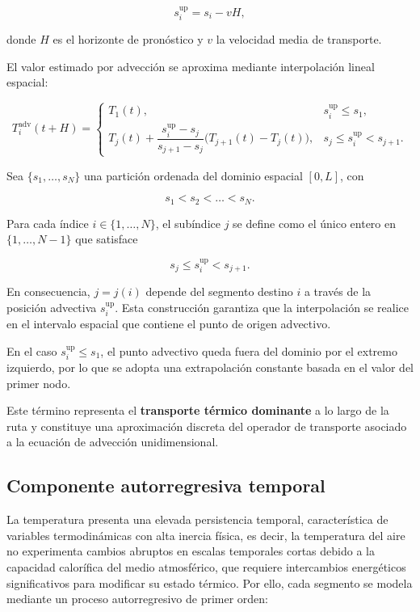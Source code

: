 \documentclass[
  spanish,
  us-letterpaper,
]{scrreprt}
\numberwithin{equation}{section}
\begin{document}
\[
s_i^{\text{up}} = s_i - vH,
\]

donde \(H\) es el horizonte de pronóstico y \(v\) la velocidad media de
transporte.

El valor estimado por advección se aproxima mediante interpolación
lineal espacial:

\[
T_i^{\text{adv}}(t+H) =
\begin{cases}
T_1(t), & s_i^{\text{up}} \le s_1, \\[6pt]
T_j(t) + \dfrac{s_i^{\text{up}} - s_j}{s_{j+1}-s_j}\bigl(T_{j+1}(t)-T_j(t)\bigr), & s_j \le s_i^{\text{up}} < s_{j+1}.
\end{cases}
\]

Sea \(\{s_1,\dots,s_N\}\) una partición ordenada del dominio espacial
\([0,L]\), con

\[
s_1 < s_2 < \dots < s_N.
\]

Para cada índice \(i \in \{1,\dots,N\}\), el subíndice \(j\) se define
como el único entero en \(\{1,\dots,N-1\}\) que satisface

\[
s_j \le s_i^{\text{up}} < s_{j+1}.
\]

En consecuencia, \(j = j(i)\) depende del segmento destino \(i\) a
través de la posición advectiva \(s_i^{\text{up}}\). Esta construcción
garantiza que la interpolación se realice en el intervalo espacial que
contiene el punto de origen advectivo.

En el caso \(s_i^{\text{up}} \le s_1\), el punto advectivo queda fuera
del dominio por el extremo izquierdo, por lo que se adopta una
extrapolación constante basada en el valor del primer nodo.

Este término representa el \textbf{transporte térmico dominante} a lo
largo de la ruta y constituye una aproximación discreta del operador de
transporte asociado a la ecuación de advección unidimensional.

\subsection{Componente autorregresiva
temporal}\label{componente-autorregresiva-temporal-1}

La temperatura presenta una elevada persistencia temporal,
característica de variables termodinámicas con alta inercia física, es
decir, la temperatura del aire no experimenta cambios abruptos en
escalas temporales cortas debido a la capacidad calorífica del medio
atmosférico, que requiere intercambios energéticos significativos para
modificar su estado térmico. Por ello, cada segmento se modela mediante
un proceso autorregresivo de primer orden:
\end{document}
